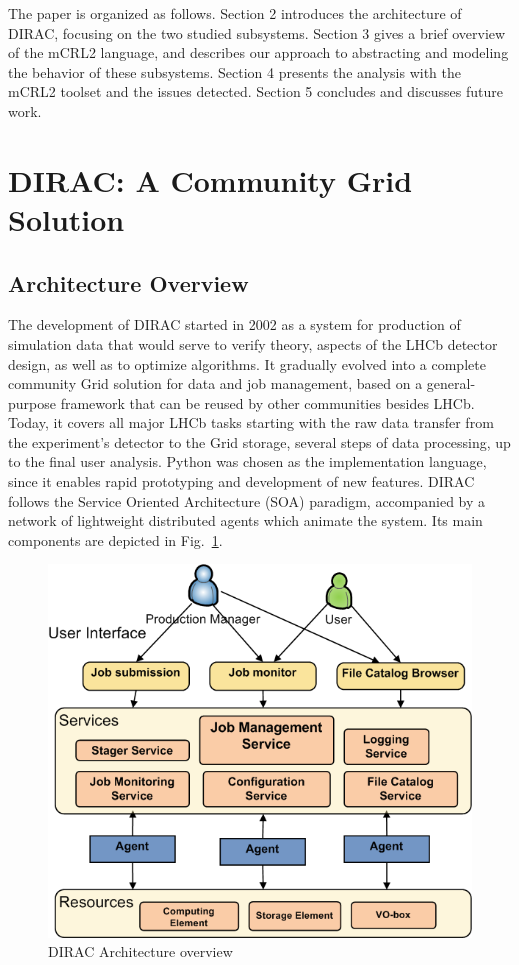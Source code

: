 \documentclass[10pt,conference]{IEEEtran}
\begin{document}
The paper is organized as follows. Section 2 introduces the architecture
of DIRAC, focusing on the two studied subsystems. Section 3 gives a brief
overview of the mCRL2 language, and describes our approach to abstracting
and modeling the behavior of these subsystems. Section 4 presents the
analysis with the mCRL2 toolset and the issues detected. Section 5
concludes and discusses future work. 

\section{DIRAC: A Community Grid Solution}
\label{sec:Section_2}
\subsection{Architecture Overview}

The development of DIRAC started in 2002 as a system for production of simulation
data that would serve to verify theory, aspects of the LHCb detector design, as
well as to optimize algorithms. It gradually evolved into a complete community
Grid solution for data and job management, based on a general-purpose framework
that can be reused by other communities besides LHCb. Today, it covers all major
LHCb tasks starting with the raw data transfer from the experiment’s detector to
the Grid storage, several steps of data processing, up to the final user
analysis. Python was chosen as the implementation language, since it enables
rapid prototyping and development of new features. DIRAC follows the Service
Oriented Architecture (SOA) paradigm, accompanied by a network of lightweight
distributed agents which animate the system. Its main components are depicted in
Fig.~\ref{fig:DIRAC-Arch}. 

\begin{figure}[t]
\includegraphics[width=0.85\linewidth,keepaspectratio=true]{./DIRAC_Architecture.png}
\centering
\caption{DIRAC Architecture overview}
\label{fig:DIRAC-Arch}
\end{figure}
\end{document}
